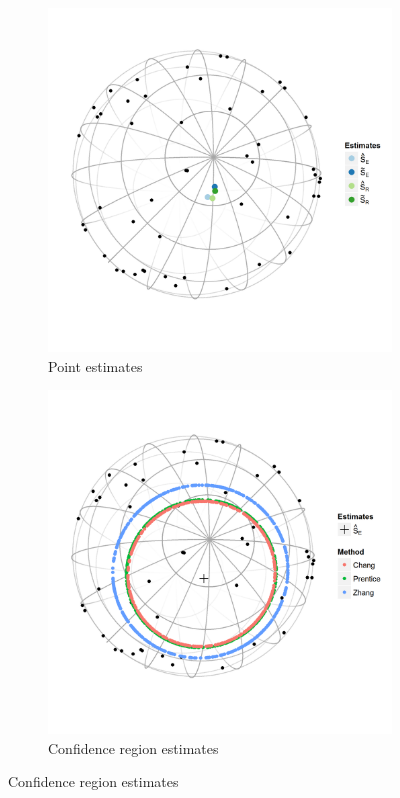 \begin{figure}[h]
	\centering
	\begin{subfigure}[h]{.45\textwidth}
		\includegraphics[width=\textwidth]{figures/eye2}
		\caption{Point estimates}
		\label{fig:ests}
	\end{subfigure}
	\begin{subfigure}[h]{.45\textwidth}
		\includegraphics[width=\textwidth]{figures/eye3}
		\caption{Confidence region estimates}
		\label{fig:regs}
	\end{subfigure}
	

\end{figure}
